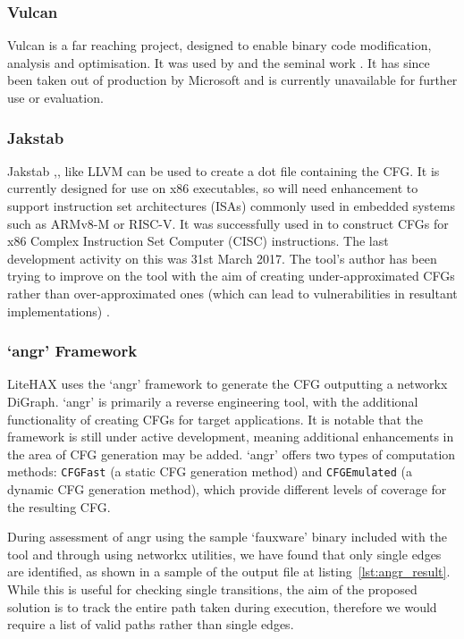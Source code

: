 \subsubsection*{Vulcan}

Vulcan \cite{Edwards2001} is a far reaching project, designed to enable binary code modification, analysis and optimisation. It was used by \cite{Davi2012} and the seminal work \cite{Abadi2005}. It has since been taken out of production by Microsoft and is currently unavailable for further use or evaluation.

\subsubsection*{Jakstab}

Jakstab \cite{Kinder2008},\cite{Kinder2010}, like LLVM can be used to create a dot file containing the CFG. It is currently designed for use on x86 executables, so will need enhancement to support instruction set architectures (ISAs) commonly used in embedded systems such as ARMv8-M or RISC-V. It was successfully used in \cite{Nguyen2013} to construct CFGs for x86 Complex Instruction Set Computer (CISC) instructions. The last development activity on this was 31st March 2017. The tool's author has been trying to improve on the tool with the aim of creating under-approximated CFGs rather than over-approximated ones (which can lead to vulnerabilities in resultant implementations) \cite{Kinder2012}.

\subsubsection*{`angr' Framework}

LiteHAX \cite{Dessouky2018} uses the `angr' \cite{Shoshitaishvili2016} framework to generate the CFG outputting a networkx \cite{Hagberg2008} DiGraph. `angr' is primarily a reverse engineering tool, with the additional functionality of creating CFGs for target applications. It is notable that the framework is still under active development, meaning additional enhancements in the area of CFG generation may be added. `angr' offers two types of computation methods: \verb|CFGFast| (a static CFG generation method) and \verb|CFGEmulated| (a dynamic CFG generation method), which provide different levels of coverage for the resulting CFG.  

During assessment of angr using the sample `fauxware' binary included with the tool and through using networkx utilities, we have found that only single edges are identified, as shown in a sample of the output file at listing~\ref{lst:angr_result}. While this is useful for checking single transitions, the aim of the proposed solution is to track the entire path taken during execution, therefore we would require a list of valid paths rather than single edges.

